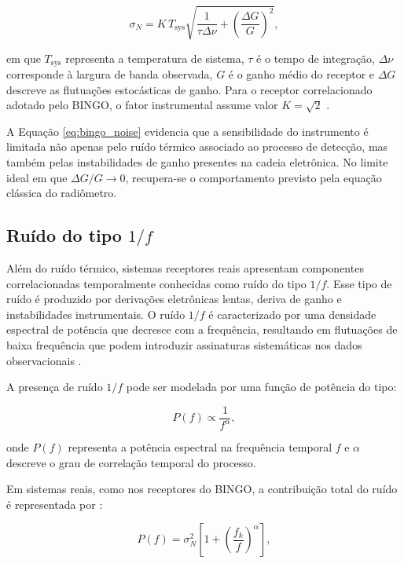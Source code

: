 \begin{equation}
\sigma_N=
K\,T_{\mathrm{sys}}
\sqrt{
\frac{1}{\tau \Delta \nu}
+
\left(
\frac{\Delta G}{G}
\right)^2
},
\label{eq:bingo_noise}
\end{equation}

em que \(T_{\mathrm{sys}}\) representa a temperatura de sistema, \(\tau\) é o tempo de integração, \(\Delta\nu\) corresponde à largura de banda observada, \(G\) é o ganho médio do receptor e \(\Delta G\) descreve as flutuações estocásticas de ganho. Para o receptor correlacionado adotado pelo BINGO, o fator instrumental assume valor \(K=\sqrt{2}\) \cite{abdalla2022bingoI}.

A Equação \ref{eq:bingo_noise} evidencia que a sensibilidade do instrumento é limitada não apenas pelo ruído térmico associado ao processo de detecção, mas também pelas instabilidades de ganho presentes na cadeia eletrônica. No limite ideal em que \(\Delta G/G \rightarrow 0\), recupera-se o comportamento previsto pela equação clássica do radiômetro.

\subsection{Ruído do tipo \(1/f\)}
Além do ruído térmico, sistemas receptores reais apresentam componentes correlacionadas temporalmente conhecidas como ruído do tipo \(1/f\). Esse tipo de ruído é produzido por derivações eletrônicas lentas, deriva de ganho e instabilidades instrumentais. O ruído \(1/f\) é caracterizado por uma densidade espectral de potência que decresce com a frequência, resultando em flutuações de baixa frequência que podem introduzir assinaturas sistemáticas nos dados observacionais \cite{thompson2017interferometry,mericia2019hi}.

A presença de ruído \(1/f\) pode ser modelada por uma função de potência do tipo:

\begin{equation}
P(f)\propto
\frac{1}{f^{\alpha}},
\end{equation}

onde \(P(f)\) representa a potência espectral na frequência temporal \(f\) e \(\alpha\) descreve o grau de correlação temporal do processo.

Em sistemas reais, como nos receptores do BINGO, a contribuição total do ruído é representada por \cite{abdalla2022bingoI}:

\begin{equation}
    P(f) = \sigma_N^2 \left[1 + \left(\frac{f_k}{f}\right)^{\alpha}\right],
\label{eq}
\end{equation}

